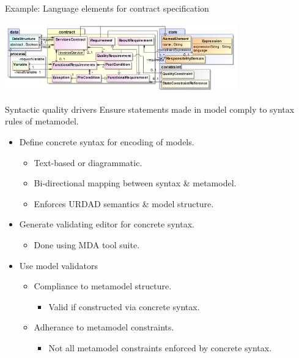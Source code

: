 
\begin{frame}{Example: Language elements for contract specification}

  \includegraphics[width=100mm]{contract}

\end{frame}



\begin{frame}{Syntactic quality drivers}
  Ensure statements made in model comply to syntax rules of metamodel.
  \pause
  \begin{itemize}
    \item<+-| alert@+> Define concrete syntax for encoding of models.
      \begin{itemize}
		  \item Text-based or diagrammatic.
		  \item Bi-directional mapping between syntax \& metamodel.
		  \item Enforces URDAD semantics \& model structure.
      \end{itemize}
    \item<+-| alert@+> Generate validating editor for concrete syntax.
      \begin{itemize}
		  \item Done using MDA tool suite.
      \end{itemize}
    \item<+-| alert@+> Use model validators
      \begin{itemize}
		  \item Compliance to metamodel structure.
			 \begin{itemize}
				\item Valid if constructed via concrete syntax.
			 \end{itemize}
		  \item Adherance to metamodel constraints.
			 \begin{itemize}
				\item Not all metamodel constraints enforced by concrete syntax.
			 \end{itemize}
      \end{itemize}
  \end{itemize}
\end{frame}

